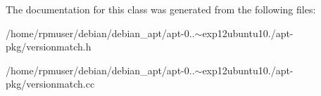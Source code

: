 \-The documentation for this class was generated from the following files\-:\begin{DoxyCompactItemize}
\item 
/home/rpmuser/debian/debian\-\_\-apt/apt-\/0..$\sim$exp12ubuntu10./apt-\/pkg/versionmatch.\-h\item 
/home/rpmuser/debian/debian\-\_\-apt/apt-\/0..$\sim$exp12ubuntu10./apt-\/pkg/versionmatch.\-cc\end{DoxyCompactItemize}
